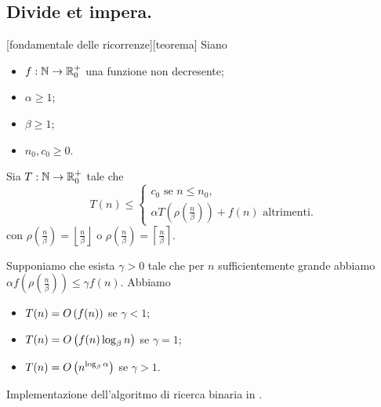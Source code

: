 \subsection{Divide et impera.}
\label{AlgoritmiEStruttureDiDati_DivideEtImpera}
\begin{Theorem}
  [fondamentale delle ricorrenze][teorema]
  Siano
  \begin{itemize}
    \item $f: \mathbb{N} \rightarrow \mathbb{R}^+_0$ una funzione non decresente;
    \item $\alpha \geq 1$;
    \item $\beta \geq 1$;
    \item $n_0, c_0 \geq 0$.
  \end{itemize}
  Sia $T: \mathbb{N} \rightarrow \mathbb{R}^+_0$ tale che
  \[
    T(n) \leq
    \begin{cases}
      c_0\text{ se }n \leq n_0,\\
      \alpha T \left ( \rho \left (\frac{n}{\beta} \right ) \right ) + f(n)\text{ altrimenti}.
    \end{cases}
  \]
  con
  $\rho \left ( \frac{n}{\beta} \right )
    = \left \lfloor \frac{n}{\beta} \right \rfloor$
  o
  $\rho \left ( \frac{n}{\beta} \right )
    = \left \lceil \frac{n}{\beta} \right \rceil$.
  \par Supponiamo che esista $\gamma > 0$ tale che per $n$ sufficientemente
  grande abbiamo
  $\alpha f \left ( \rho \left ( \frac{n}{\beta} \right ) \right )
    \leq \gamma f(n)$.
  Abbiamo
  \begin{itemize}
    \item $T(n) = O \left ( f(n) \right )$ se $\gamma < 1$;
    \item $T(n) = O \left ( f(n) \log_\beta n \right )$ se $\gamma = 1$;
    \item $T(n) = O \left ( n^{\log_\beta \alpha} \right )$ se $\gamma > 1$.
  \end{itemize}
\end{Theorem}
\begin{listing}
	\caption{Implementazione dell'algoritmo di ricerca binaria in .}
\end{listing}
